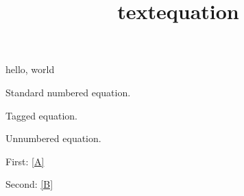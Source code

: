\documentclass{amsart}
\title{textequation}
\begin{document}
\maketitle

hello, world

\begin{textequation}\label{A}
Standard numbered equation.
\end{textequation}

\begin{textequation}
Tagged equation.\label{B}
\end{textequation}

\begin{textequation}\notag
Unnumbered equation.
\end{textequation}

First: \eqref{A}

Second: \eqref{B}
\end{document}
